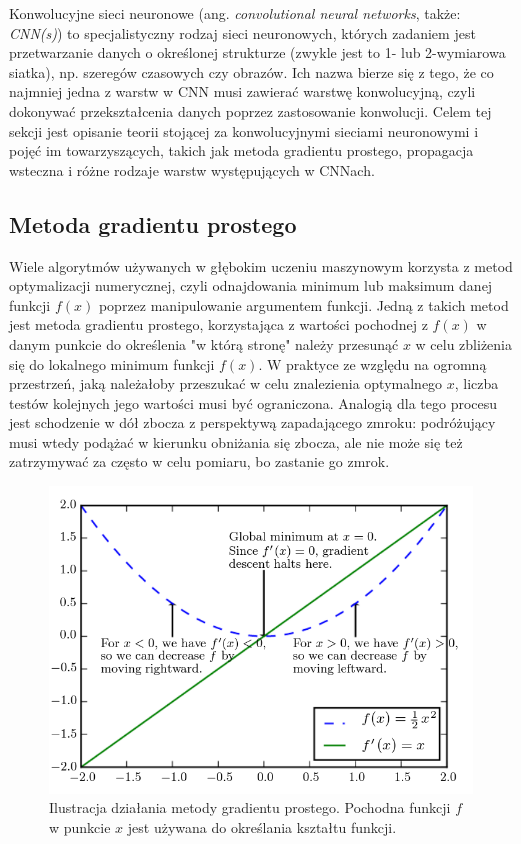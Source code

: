 \documentclass[12pt,a4paper,leqno,oneside,titlepage]{book}
\begin{document}
Konwolucyjne sieci neuronowe (ang. \textit{convolutional neural networks}, także: \textit{CNN(s)}) to specjalistyczny rodzaj sieci neuronowych, których zadaniem jest przetwarzanie danych o określonej strukturze (zwykle jest to 1- lub 2-wymiarowa siatka), np. szeregów czasowych czy obrazów. Ich nazwa bierze się z tego, że co najmniej jedna z warstw w CNN musi zawierać warstwę konwolucyjną, czyli dokonywać przekształcenia danych poprzez zastosowanie konwolucji.\cite{Goodfellow-et-al-2016} Celem tej sekcji jest opisanie teorii stojącej za konwolucyjnymi sieciami neuronowymi i pojęć im towarzyszących, takich jak metoda gradientu prostego, propagacja wsteczna i różne rodzaje warstw występujących w CNNach.

\subsection{Metoda gradientu prostego}

Wiele algorytmów używanych w głębokim uczeniu maszynowym korzysta z metod optymalizacji numerycznej, czyli odnajdowania minimum lub maksimum danej funkcji $f(x)$ poprzez manipulowanie argumentem funkcji. Jedną z takich metod jest metoda gradientu prostego, korzystająca z wartości pochodnej z $f(x)$ w danym punkcie do określenia "w którą stronę" należy przesunąć $x$ w celu zbliżenia się do lokalnego minimum funkcji $f(x)$. W praktyce ze względu na ogromną przestrzeń, jaką należałoby przeszukać w celu znalezienia optymalnego $x$, liczba testów kolejnych jego wartości musi być ograniczona. Analogią dla tego procesu jest schodzenie w dół zbocza z perspektywą zapadającego zmroku: podróżujący musi wtedy podążać w kierunku obniżania się zbocza, ale nie może się też zatrzymywać za często w celu pomiaru, bo zastanie go zmrok.

\begin{figure}[!tbp]
  \centering
  \begin{minipage}[b]{0.5\textheight}
    \includegraphics[width=\textwidth]{pictures/gradient_descent.png}
  \end{minipage}
  \caption{Ilustracja działania metody gradientu prostego. Pochodna funkcji $f$ w punkcie $x$ jest używana do określania kształtu funkcji.\cite{Goodfellow-et-al-2016}}
  \label{fig:gradient_descent}
\end{figure}
\end{document}
